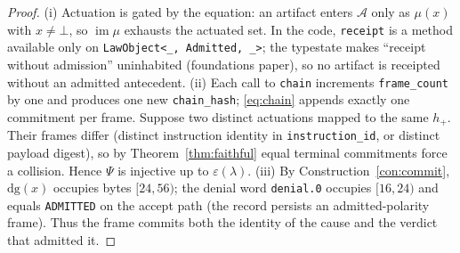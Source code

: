 \documentclass[11pt,oneside]{book}
\theoremstyle{definition}
\theoremstyle{plain}
\theoremstyle{remark}
\newcommand{\Act}{\mathcal{A}}                 %
\newcommand{\muop}{\mu}                        %
\newcommand{\Rfsl}{\bot}                        %
\newcommand{\dg}{\mathrm{dg}}                   %
\DeclareMathOperator{\im}{im}
\newcommand{\code}[1]{\texttt{#1}}
\begin{document}
\begin{proof}
(i) Actuation is gated by the equation: an artifact enters $\Act$ only as $\muop(x)$ with
$x\ne\Rfsl$, so $\im\muop$ exhausts the actuated set. %
In the code, \code{receipt} is a method
available only on \code{LawObject<\_, Admitted, \_>}; the typestate makes ``receipt without
admission'' uninhabited (foundations paper), so no artifact is receipted without an admitted
antecedent. %
(ii) Each call to \code{chain} increments \code{frame\_count} by one and produces one new
\code{chain\_hash}; \eqref{eq:chain} appends exactly one commitment per frame. %
Suppose two
distinct actuations mapped to the same $h_{+}$. %
Their frames differ (distinct instruction
identity in \code{instruction\_id}, or distinct payload digest), so by
Theorem~\ref{thm:faithful} equal terminal commitments force a collision. %
Hence $\Psi$ is
injective up to $\varepsilon(\lambda)$. %
(iii) By Construction~\ref{con:commit}, $\dg(x)$ occupies bytes $[24,56)$; the denial word
\code{denial.0} occupies $[16,24)$ and equals \code{ADMITTED} on the accept path (the record
persists an admitted-polarity frame). %
Thus the frame commits both the identity of the cause
and the verdict that admitted it. %
 \end{proof}
\end{document}
